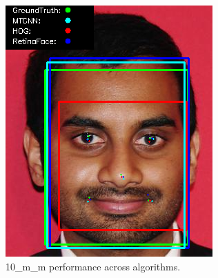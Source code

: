 \documentclass{l4proj}
\begin{document}
\begin{appendices}
\begin{figure}[h!]
  \centering
  \begin{minipage}{0.49\textwidth}
    \centering
     \includegraphics[width=\textwidth]{images/appendix/10.png}
    \caption{10\_m\_m performance across algorithms.}
    \label{whoopi_result}
  \end{minipage}
    \hfill
    \begin{minipage}{0.49\textwidth}
    \centering

\end{minipage}
\end{figure}
\end{appendices}
\end{document}
